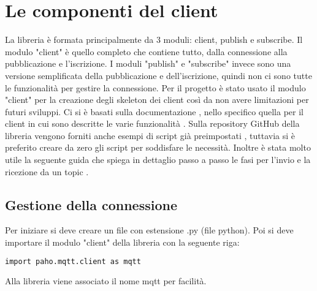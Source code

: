 \section{Le componenti del client}
\label{sec:client-creazione}
La libreria è formata principalmente da 3 moduli: client, publish e subscribe.
Il modulo "client" è quello completo che contiene tutto, dalla connessione alla pubblicazione e l'iscrizione.
I moduli "publish" e "subscribe" invece sono una versione semplificata della pubblicazione e dell'iscrizione,
quindi non ci sono tutte le funzionalità per gestire la connessione.\newline
Per il progetto è stato usato il modulo "client" per la creazione degli skeleton dei client
così da non avere limitazioni per futuri sviluppi.
Ci si è basati sulla documentazione \cite{client-paho-doc-complete}, 
nello specifico quella per il client in cui sono descritte le varie funzionalità \cite{client-paho-doc-client}.
Sulla repository GitHub della libreria vengono forniti anche esempi di script già preimpostati \cite{client-paho-doc-examples},
tuttavia si è preferito creare da zero gli script per soddisfare le necessità.
Inoltre è stata molto utile la seguente guida che spiega in dettaglio passo a passo 
le fasi per l'invio e la ricezione da un topic \cite{client-paho-guide-1}.

\subsection{Gestione della connessione}
\label{subsec:client-creazione-connesione}
Per iniziare si deve creare un file con estensione .py (file python).
Poi si deve importare il modulo "client" della libreria con la seguente riga:
\begin{lstlisting}[language=bash]
	import paho.mqtt.client as mqtt
\end{lstlisting}
Alla libreria viene associato il nome mqtt per facilità.

